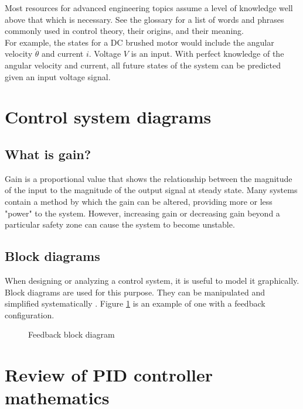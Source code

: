 \documentclass[10pt,conference,compsoc]{IEEEtran}
\begin{document}
\noindent Most resources for advanced engineering topics assume a level of
knowledge well above that which is necessary. See the glossary for a list of
words and phrases commonly used in control theory, their origins, and their
meaning. \\

\noindent For example, the \glspl{state} for a DC brushed motor would include
the angular velocity $\dot{\theta}$ and current $i$. Voltage $V$ is an input.
With perfect knowledge of the angular velocity and current, all future
\glspl{state} of the \gls{system} can be predicted given an input voltage
signal. \\

\section{Control system diagrams}

\subsection{What is gain?}

\noindent Gain is a proportional value that shows the relationship between the
magnitude of the input to the magnitude of the output signal at steady state.
Many \glspl{system} contain a method by which the gain can be altered, providing
more or less "power" to the \gls{system}. However, increasing gain or decreasing
gain beyond a particular safety zone can cause the \gls{system} to become
unstable.

\subsection{Block diagrams}

\noindent When designing or analyzing a control system, it is useful to model it
graphically. Block diagrams are used for this purpose. They can be manipulated
and simplified systematically \cite{bib:block_diagrams}. Figure
\ref{fig:feedback_loop} is an example of one with a feedback configuration.

\begin{figure}[H]
  \centering
  \def\svgwidth{0.5\columnwidth}
  
  \caption{Feedback block diagram}
  \label{fig:feedback_loop}
\end{figure}

\section{Review of PID controller mathematics}
\end{document}
